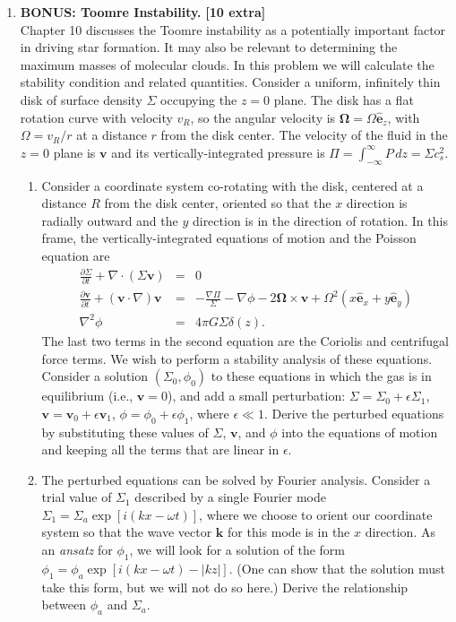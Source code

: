 \documentclass{article}
\newcommand{\veco}{{\mathbf{\Omega}}}
\newcommand{\vecv}{\mathbf{v}}
\newcommand{\ehat}{\hat{\mathbf{e}}}
\begin{document}
\begin{enumerate}
\item \textbf{BONUS: Toomre Instability.} \textbf{[10 extra]}\\
Chapter 10 discusses the Toomre instability as a potentially important factor in driving star formation. It may also be relevant to determining the maximum masses of molecular clouds. In this problem we will calculate the stability condition and related quantities. Consider a uniform, infinitely thin disk of surface density $\Sigma$ occupying the $z=0$ plane. The disk has a flat rotation curve with velocity $v_R$, so the angular velocity is $\veco=\Omega \ehat_z$, with $\Omega = v_R/r$ at a distance $r$ from the disk center. The velocity of the fluid in the $z=0$ plane is $\vecv$ and its vertically-integrated pressure is $\Pi=\int_{-\infty}^{\infty} P \, dz = \Sigma c_s^2$. 
\begin{enumerate}
\item Consider a coordinate system co-rotating with the disk, centered at a distance $R$ from the disk center, oriented so that the $x$ direction is radially outward and the $y$ direction is in the direction of rotation. In this frame, the vertically-integrated equations of motion and the Poisson equation are
\begin{eqnarray*}
\frac{\partial \Sigma}{\partial t} + \nabla \cdot (\Sigma \vecv) & = & 0 \\
\frac{\partial \vecv}{\partial t} + (\vecv\cdot\nabla)\vecv & = & -\frac{\nabla \Pi}{\Sigma} - \nabla \phi - 2\veco \times \vecv + \Omega^2 (x \ehat_x + y \ehat_y) \\
\nabla^2 \phi & = & 4 \pi G \Sigma \delta(z).
\end{eqnarray*}
The last two terms in the second equation are the Coriolis and centrifugal force terms.
We wish to perform a stability analysis of these equations. Consider a solution $(\Sigma_0, \phi_0)$ to these equations in which the gas is in equilibrium (i.e., $\vecv=0$), and add a small perturbation: $\Sigma=\Sigma_0 + \epsilon \Sigma_1$, $\vecv = \vecv_0 + \epsilon \vecv_1$, $\phi=\phi_0 + \epsilon \phi_1$, where $\epsilon \ll 1$. Derive the perturbed equations by substituting these values of $\Sigma$, $\vecv$, and $\phi$ into the equations of motion and keeping all the terms that are linear in $\epsilon$.
\item The perturbed equations can be solved by Fourier analysis. Consider a trial value of $\Sigma_1$ described by a single Fourier mode $\Sigma_1 = \Sigma_a \exp[i(kx - \omega t)]$, where we choose to orient our coordinate system so that the wave vector $\mathbf{k}$ for this mode is in the $x$ direction. As an {\it ansatz} for $\phi_1$, we will look for a solution of the form $\phi_1 = \phi_a \exp[i(kx - \omega t) - |k z|]$. (One can show that the solution must take this form, but we will not do so here.) Derive the relationship between $\phi_a$ and $\Sigma_a$.

\end{enumerate}
\end{enumerate}
\end{document}
